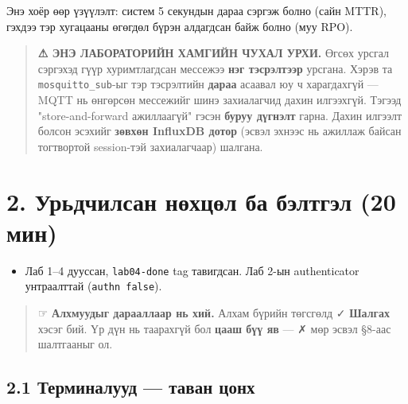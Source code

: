 Энэ хоёр өөр үзүүлэлт: систем 5 секундын дараа сэргэж болно (сайн MTTR), гэхдээ тэр хугацааны өгөгдөл бүрэн алдагдсан байж болно (муу RPO).

\begin{quote}
\textbf{⚠ ЭНЭ ЛАБОРАТОРИЙН ХАМГИЙН ЧУХАЛ УРХИ.} Өгсөх урсгал сэргэхэд гүүр хуримтлагдсан мессежээ \textbf{нэг тэсрэлтээр} урсгана. Хэрэв та \texttt{mosquitto\_sub}-ыг тэр тэсрэлтийн \textbf{дараа} асаавал юу ч харагдахгүй --- MQTT нь өнгөрсөн мессежийг шинэ захиалагчид дахин илгээхгүй. Тэгээд "store-and-forward ажиллаагүй" гэсэн \textbf{буруу дүгнэлт} гарна. Дахин илгээлт болсон эсэхийг \textbf{зөвхөн InfluxDB дотор} (эсвэл эхнээс нь ажиллаж байсан тогтвортой session-тэй захиалагчаар) шалгана.
\end{quote}

\hypertarget{ux443ux440ux44cux434ux447ux438ux43bux441ux430ux43d-ux43dux4e9ux445ux446ux4e9ux43b-ux431ux430-ux431ux44dux43bux442ux433ux44dux43b-20-ux43cux438ux43d}{%
\section{2. Урьдчилсан нөхцөл ба бэлтгэл (20 мин)}\label{ux443ux440ux44cux434ux447ux438ux43bux441ux430ux43d-ux43dux4e9ux445ux446ux4e9ux43b-ux431ux430-ux431ux44dux43bux442ux433ux44dux43b-20-ux43cux438ux43d}}

\begin{itemize}
\tightlist
\item
  Лаб 1--4 дууссан, \texttt{lab04-done} tag тавигдсан. Лаб 2-ын authenticator унтраалттай (\texttt{authn\ false}).
\end{itemize}

\begin{quote}
☞ \textbf{Алхмуудыг дарааллаар нь хий.} Алхам бүрийн төгсгөлд ✓ \textbf{Шалгах} хэсэг бий. Үр дүн нь таарахгүй бол \textbf{цааш бүү яв} --- ✗ мөр эсвэл §8-аас шалтгааныг ол.
\end{quote}

\hypertarget{ux442ux435ux440ux43cux438ux43dux430ux43bux443ux443ux434-ux442ux430ux432ux430ux43d-ux446ux43eux43dux445}{%
\subsection{\texorpdfstring{2.1 Терминалууд --- \textbf{таван} цонх}{2.1 Терминалууд --- таван цонх}}\label{ux442ux435ux440ux43cux438ux43dux430ux43bux443ux443ux434-ux442ux430ux432ux430ux43d-ux446ux43eux43dux445}}

